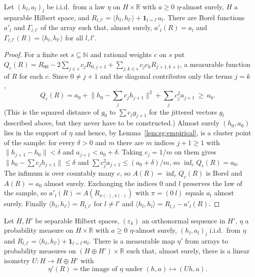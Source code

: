 \begin{lemma}\label{lem:sg:diag-residual}
  \leanok
Let $(h_l,a_l)_l$ be i.i.d.\ from a law $\eta$ on $H\times\mathbb R$ with $a\ge0$ $\eta$-almost surely, $H$ a separable Hilbert space, and $R_{l,l'}=\langle h_l,h_{l'}\rangle+\mathbf 1_{l=l'}a_l$. There are Borel functions $a'_l$ and $\Gamma_{l,l'}$ of the array such that, almost surely, $a'_l(R)=a_l$ and $\Gamma_{l,l'}(R)=\langle h_l,h_{l'}\rangle$ for all $l,l'$.
\end{lemma}

\begin{proof}
  \leanok
{}
For a finite set $s\subseteq\mathbb N$ and rational weights $c$ on $s$ put $Q_c(R)=R_{00}-2\sum_{j\in s}c_jR_{0,j+1}+\sum_{j,k\in s}c_jc_kR_{j+1,k+1}$, a measurable function of $R$ for each $c$. Since $0\ne j+1$ and the diagonal contributes only the terms $j=k$,
\[Q_c(R)=a_0+\Big\|h_0-\sum_{j}c_jh_{j+1}\Big\|^2+\sum_jc_j^2a_{j+1}\ \ge\ a_0.\]
(This is the squared distance of $g_0$ to $\sum c_jg_{j+1}$ for the jittered vectors $g_l$ described above, but they never have to be constructed.) Almost surely $(h_0,a_0)$ lies in the support of $\eta$ and hence, by Lemma~\ref{lem:sg:empirical}, is a cluster point of the sample: for every $\delta>0$ and $m$ there are $m$ indices $j+1\ge1$ with $\|h_{j+1}-h_0\|<\delta$ and $a_{j+1}<a_0+\delta$. Taking $c_j=1/m$ on them gives $\|h_0-\sum c_jh_{j+1}\|\le\delta$ and $\sum c_j^2a_{j+1}\le(a_0+\delta)/m$, so $\inf_cQ_c(R)=a_0$. The infimum is over countably many $c$, so $A(R)=\inf_cQ_c(R)$ is Borel and $A(R)=a_0$ almost surely. Exchanging the indices $0$ and $l$ preserves the law of the sample, so $a'_l(R)=A(R_{\pi(\cdot),\pi(\cdot)})$ with $\pi=(0\ l)$ equals $a_l$ almost surely. Finally $\langle h_l,h_{l'}\rangle=R_{l,l'}$ for $l\ne l'$ and $\langle h_l,h_l\rangle=R_{l,l}-a'_l(R)$.
\end{proof}

\begin{theorem}\label{thm:sg:reconstruction}
  \leanok
Let $H,H'$ be separable Hilbert spaces, $(\varepsilon_k)$ an orthonormal sequence in $H'$, $\eta$ a probability measure on $H\times\mathbb R$ with $a\ge0$ $\eta$-almost surely, $(h_l,a_l)_l$ i.i.d.\ from $\eta$ and $R_{l,l'}=\langle h_l,h_{l'}\rangle+\mathbf 1_{l=l'}a_l$. There is a measurable map $\eta'$ from arrays to probability measures on $(H\oplus H')\times\mathbb R$ such that, almost surely, there is a linear isometry $U:H\to H\oplus H'$ with
\[\eta'(R)=\text{the image of }\eta\text{ under }(h,a)\mapsto(Uh,a).\]
\end{theorem}

